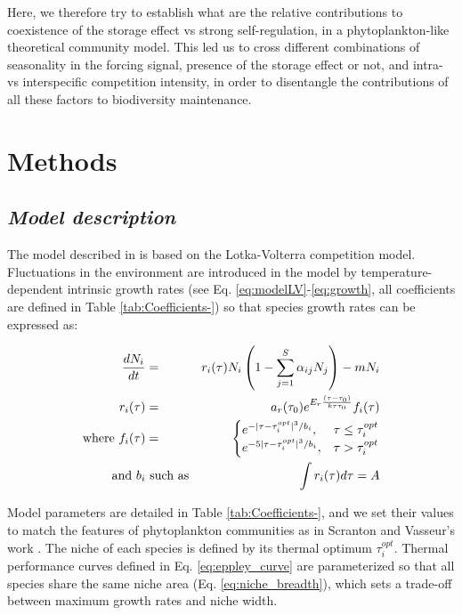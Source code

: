 \documentclass[a4paper,12pt]{article}
\begin{document}
Here, we therefore try to establish what are the relative contributions
to coexistence of the storage effect vs strong self-regulation, in
a phytoplankton-like theoretical community model. This led us to cross
different combinations of seasonality in the forcing signal, presence
of the storage effect or not, and intra- vs interspecific competition
intensity, in order to disentangle the contributions of all these
factors to biodiversity maintenance.
 
\section*{Methods}

\subsection*{\emph{Model description}}

The model described in \citet{scranton_coexistence_2016} is based
on the Lotka-Volterra competition model. Fluctuations in the environment
are introduced in the model by temperature-dependent intrinsic growth
rates (see Eq. \ref{eq:modelLV}-\ref{eq:growth}, all coefficients
are defined in Table \ref{tab:Coefficients-}) so that species growth
rates can be expressed as:

\begin{eqnarray}
\frac{dN_{i}}{dt} & = & r_{i}(\tau)N_{i}\left(1-\sum_{j=1}^{S}\alpha_{ij}N_{j}\right)-mN_{i}\label{eq:modelLV}\\
r_{i}(\tau) & = & a_{r}(\tau_{0})e^{E_{r}\frac{(\tau-\tau_{\text{0}})}{k\tau\tau_{0}}}f_{i}(\tau)\label{eq:growth}\\
\textnormal{where }f_{i}(\tau) & = & \begin{cases}
e^{-|\tau-\tau_{i}^{opt}|^{3}/b_{i}}, & \tau\leq\tau_{i}^{opt}\\
e^{-5|\tau-\tau_{i}^{opt}|^{3}/b_{i}}, & \tau>\tau_{i}^{opt}
\end{cases}\label{eq:eppley_curve}\\
\textnormal{and } b_{i}&\text{ such as} & \int r_{i}(\tau)d\tau=A\label{eq:niche_breadth}
\end{eqnarray}

Model parameters are detailed in Table \ref{tab:Coefficients-}, and
we set their values to match the features of phytoplankton communities
as in Scranton and Vasseur's work \citeyearpar{scranton_coexistence_2016}.
The niche of each species is defined by its thermal optimum $\tau_{i}^{opt}$.
Thermal performance curves defined in Eq. \ref{eq:eppley_curve} are
parameterized so that all species share the same niche area (Eq. \ref{eq:niche_breadth}),
which sets a trade-off between maximum growth rates and niche width. 
\end{document}
